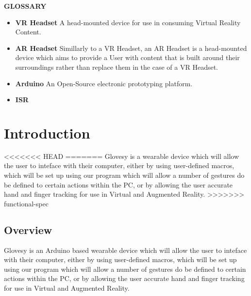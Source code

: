 \documentclass[12pt,a4paper,oneside]{book}
\theoremstyle{plain}
\numberwithin{equation}{chapter}
\renewcommand{\contentsname}{\hfill\bfseries\Large TABLE OF CONTENTS \hfill}
\newcounter{Chapnum}
\newcounter{Secnum}
\begin{document}
\newpage
\begin {center}
    \large\textbf{GLOSSARY}
\end{center}
\begin{itemize}
    \item \textbf{VR Headset} A head-mounted device for use in consuming Virtual Reality Content.
    \item \textbf{AR Headset} Simillarly to a VR Headset, an AR Headset is a head-mounted device which aims to provide a User with content that is built around their surroundings rather than replace them in the case of a VR Headset.
    \item \textbf{Arduino} An Open-Source electronic prototyping platform.
    \item \textbf{ISR} 
\end{itemize}



\newpage
\tableofcontents


\newpage
\renewcommand*\thesection{\arabic{Chapnum}.\arabic{Secnum}}
\chapter*{Introduction}

<<<<<<< HEAD
=======
\noindent Glovesy is a wearable device which will allow the user to inteface with their computer, either by using user-defined macros, which will be set up using our program which will allow a number of gestures do be defined to certain actions within the PC, or by allowing the user accurate hand and finger tracking for use in Virtual and Augmented Reality.
\vspace{2cm}
>>>>>>> functional-spec

\section{Overview}

\noindent Glovesy is an Arduino based wearable device which will allow the user to inteface with their computer, either by using user-defined macros, which will be set up using our program which will allow a number of gestures do be defined to certain actions within the PC, or by allowing the user accurate hand and finger tracking for use in Virtual and Augmented Reality.
\end{document}

